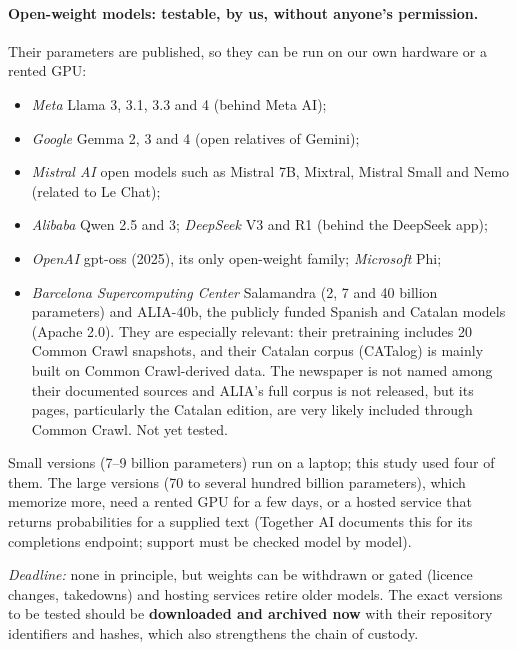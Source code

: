 \documentclass[10pt,a4paper]{article}
\begin{document}
\paragraph{Open-weight models: testable, by us, without anyone's permission.} Their parameters are published, so they
can be run on our own hardware or a rented GPU:
\begin{itemize}
\item \emph{Meta} Llama 3, 3.1, 3.3 and 4 (behind Meta AI);
\item \emph{Google} Gemma 2, 3 and 4 (open relatives of Gemini);
\item \emph{Mistral AI} open models such as Mistral 7B, Mixtral, Mistral Small and Nemo (related to Le Chat);
\item \emph{Alibaba} Qwen 2.5 and 3; \emph{DeepSeek} V3 and R1 (behind the DeepSeek app);
\item \emph{OpenAI} gpt-oss (2025), its only open-weight family; \emph{Microsoft} Phi;
\item \emph{Barcelona Supercomputing Center} Salamandra (2, 7 and 40 billion parameters) and ALIA-40b, the
publicly funded Spanish and Catalan models (Apache 2.0). They are especially relevant: their pretraining includes 20
Common Crawl snapshots, and their Catalan corpus (CATalog) is mainly built on Common Crawl-derived data. The
newspaper is not named among their documented sources and ALIA's full corpus is not released, but its pages,
particularly the Catalan edition, are very likely included through Common Crawl. Not yet tested.
\end{itemize}
Small versions (7--9 billion parameters) run on a laptop; this study used four of them. The large versions (70 to
several hundred billion parameters), which memorize more, need a rented GPU for a few days, or a hosted service that
returns probabilities for a supplied text (Together AI documents this for its completions endpoint; support must be
checked model by model).

\emph{Deadline:} none in principle, but weights can be withdrawn or gated (licence changes, takedowns) and hosting
services retire older models. The exact versions to be tested should be \textbf{downloaded and archived now} with
their repository identifiers and hashes, which also strengthens the chain of custody.
\end{document}
